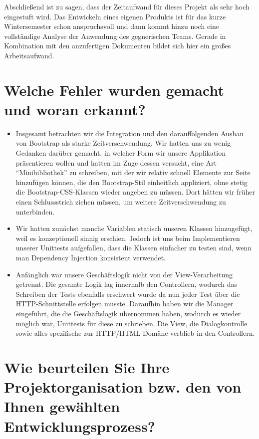 \documentclass[12pt,DIV14,BCOR10mm,a4paper,parskip=half-,headsepline,headinclude,english,ngerman,bibliography=totocnumbered]{scrreprt}
\begin{document}
Abschließend ist zu sagen, dass der Zeitaufwand für dieses Projekt als sehr hoch eingestuft wird.
Das Entwickeln eines eigenen Produkts ist für das kurze Wintersemester schon anspruchsvoll und dann kommt hinzu noch eine vollständige Analyse der Anwendung des gegnerischen Teams.
Gerade in Kombination mit den anzufertigen Dokumenten bildet sich hier ein großes Arbeitsaufwand.

\section{Welche Fehler wurden gemacht und woran erkannt?}

\begin{itemize}
  \item Insgesamt betrachten wir die Integration und den darauffolgenden Ausbau von Bootstrap als starke Zeitverschwendung. Wir hatten uns zu wenig Gedanken darüber gemacht, in welcher Form wir unsere Applikation präsentieren wollen und hatten im Zuge dessen versucht, eine Art \enquote{Minibibliothek} zu schreiben, mit der wir relativ schnell Elemente zur Seite hinzufügen können, die den Bootstrap-Stil einheitlich appliziert, ohne stetig die Bootstrap-CSS-Klassen wieder angeben zu müssen. Dort hätten wir früher einen Schlussstrich ziehen müssen, um weitere Zeitverschwendung zu unterbinden.
  \item Wir hatten zunächst manche Variablen statisch unseren Klassen hinzugefügt, weil es konzeptionell sinnig erschien. Jedoch ist uns beim Implementieren unserer Unittests aufgefallen, dass die Klassen einfacher zu testen sind, wenn man Dependency Injection konsistent verwendet.
  \item Anfänglich war unsere Geschäftslogik nicht von der View-Verarbeitung getrennt. Die gesamte Logik lag innerhalb den Controllern, wodurch das Schreiben der Tests ebenfalls erschwert wurde da nun jeder Test über die HTTP-Schnittstelle erfolgen musste. Daraufhin haben wir die Manager eingeführt, die die Geschäftslogik übernommen haben, wodurch es wieder möglich war, Unittests für diese zu schrieben. Die View, die Dialogkontrolle sowie alles spezifische zur HTTP/HTML-Domäne verblieb in den Controllern.
\end{itemize}

\section{Wie beurteilen Sie Ihre Projektorganisation bzw. den von Ihnen gewählten Entwicklungsprozess?}
\end{document}
